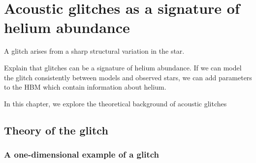%
%
%
%
%
\chapter[Acoustic glitches]{Acoustic glitches as a signature of helium abundance}\label{chap:glitch}

A glitch arises from a sharp structural variation in the star.

Explain that glitches can be a signature of helium abundance. If we can model the glitch consistently between models and observed stars, we can add parameters to the HBM which contain information about helium.

In this chapter, we explore the theoretical background of acoustic glitches

\section{Theory of the glitch}

\subsection[1D example]{A one-dimensional example of a glitch}

